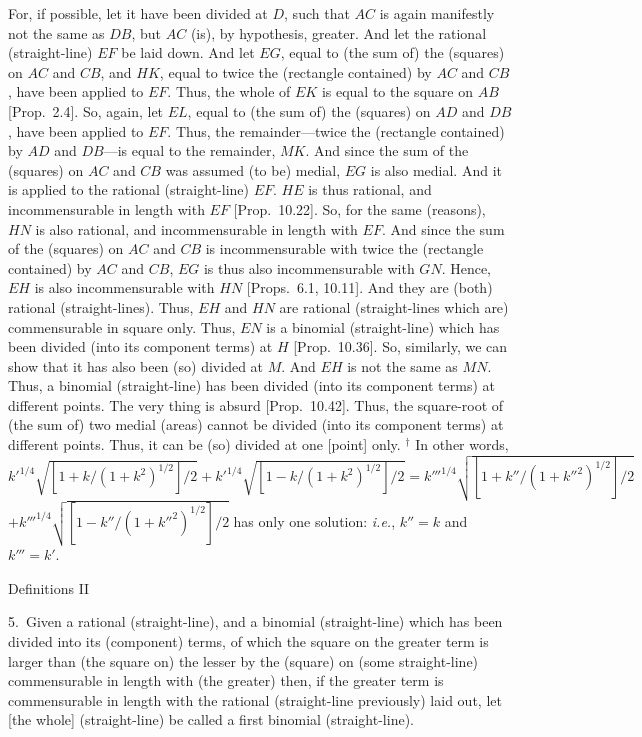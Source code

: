 For, if possible, let it have been divided at $D$, such that $AC$ is again
manifestly not the same as $DB$, but $AC$ (is), by hypothesis, greater.
And let the rational (straight-line) $EF$ be laid down. And let $EG$,
equal to (the sum of) the (squares) on $AC$ and $CB$, and $HK$, equal to twice the (rectangle contained) by $AC$ and $CB$,
have been applied to $EF$. Thus, the whole of $EK$ is equal to the
square on $AB$ [Prop.~2.4]. So, again, let $EL$, equal to (the sum of) the (squares)
on $AD$ and $DB$, have been applied to $EF$. Thus, the remainder---twice
the (rectangle contained) by $AD$ and $DB$---is equal to the remainder, $MK$. And since the sum of the (squares) on $AC$ and $CB$
was assumed (to be) medial, $EG$ is also medial. And it is applied
to the rational (straight-line) $EF$. $HE$ is thus rational, and incommensurable in length with $EF$ [Prop.~10.22].  So, for the same (reasons), 
$HN$ is also rational, and incommensurable in length with $EF$.
And since the sum of the (squares) on $AC$ and $CB$ is incommensurable
with twice the (rectangle contained) by $AC$ and $CB$, $EG$ is thus also
incommensurable with $GN$. Hence, $EH$ is also incommensurable with
$HN$ [Props.~6.1, 10.11].
And they are (both) rational (straight-lines). Thus, $EH$ and $HN$ are rational
(straight-lines which are) commensurable in  square only. Thus, $EN$
is a binomial (straight-line) which has been divided (into its component
terms) at $H$ [Prop.~10.36]. So, similarly, we can show that
it has also been (so) divided at $M$. And $EH$ is not the same  as $MN$. Thus,
a binomial (straight-line) has been divided (into its component
terms) at different points. The
very thing is absurd [Prop.~10.42]. Thus,
the square-root of (the sum of) two medial (areas) cannot be divided (into its component terms) at different
points. Thus, it can be (so) divided at one [point] only.
{\footnotesize\noindent$^\dag$ In other words, $k'^{1/4}\sqrt{[1+k/(1+k^2)^{1/2}]/2}
+k'^{1/4}\sqrt{[1-k/(1+k^2)^{1/2}]/2}=k'''^{1/4}\sqrt{[1+k''/(1+k''^2)^{1/2}]/2}$\\$
+k'''^{1/4}\sqrt{[1-k''/(1+k''^2)^{1/2}]/2}$ has only one solution: {\em i.e.}, $k''=k$ and $k'''=k'$.}


\begin{center}
{\large Definitions II}
\end{center}

5.~Given a rational (straight-line), and  a binomial (straight-line) which has been divided into its (component) terms, of which the square on the greater term
is larger than (the square on) the lesser  by the (square) on (some straight-line) commensurable in length with (the greater) then,
if the greater term is commensurable in length with the  rational (straight-line previously) laid out,
 let [the whole] (straight-line) be called a first binomial (straight-line).
 
